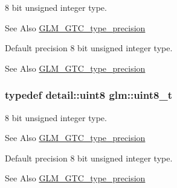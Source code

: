 8 bit unsigned integer type. \begin{DoxySeeAlso}{See Also}
\hyperlink{group__gtc__type__precision}{G\-L\-M\-\_\-\-G\-T\-C\-\_\-type\-\_\-precision}
\end{DoxySeeAlso}
Default precision 8 bit unsigned integer type. \begin{DoxySeeAlso}{See Also}
\hyperlink{group__gtc__type__precision}{G\-L\-M\-\_\-\-G\-T\-C\-\_\-type\-\_\-precision} 
\end{DoxySeeAlso}
\hypertarget{group__gtc__type__precision_ga93adf6dd9803408f3e3aaf9dedda352b}{
\subsubsection[{uint8\-\_\-t}]{\setlength{\rightskip}{0pt plus 5cm}typedef detail\-::uint8 {\bf glm\-::uint8\-\_\-t}}}\label{group__gtc__type__precision_ga93adf6dd9803408f3e3aaf9dedda352b}
8 bit unsigned integer type. \begin{DoxySeeAlso}{See Also}
\hyperlink{group__gtc__type__precision}{G\-L\-M\-\_\-\-G\-T\-C\-\_\-type\-\_\-precision}
\end{DoxySeeAlso}
Default precision 8 bit unsigned integer type. \begin{DoxySeeAlso}{See Also}
\hyperlink{group__gtc__type__precision}{G\-L\-M\-\_\-\-G\-T\-C\-\_\-type\-\_\-precision} 
\end{DoxySeeAlso}
